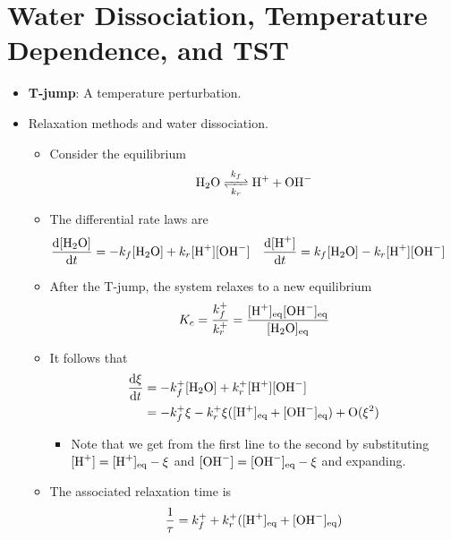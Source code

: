\documentclass[../notes.tex]{subfiles}
\begin{document}
\section{Water Dissociation, Temperature Dependence, and TST}
\begin{itemize}
    \item {}\textbf{T-jump}: A temperature perturbation.
    \item Relaxation methods and water dissociation.
    \begin{itemize}
        \item Consider the equilibrium
        \begin{equation*}
            \ce{H2O <=>[$k_f$][$k_r$] H+ + OH-}
        \end{equation*}
        \item The differential rate laws are
        \begin{align*}
            \dv{[\ce{H2O}]}{t} &= -k_f[\ce{H2O}]+k_r[\ce{H+}][\ce{OH-}]&
            \dv{[\ce{H+}]}{t} &= k_f[\ce{H2O}]-k_r[\ce{H+}][\ce{OH-}]
        \end{align*}
        \item After the T-jump, the system relaxes to a new equilibrium
        \begin{equation*}
            K_c = \frac{k_f^+}{k_r^+}
            = \frac{[\ce{H+}]_\text{eq}[\ce{OH-}]_\text{eq}}{[\ce{H2O}]_\text{eq}}
        \end{equation*}
        \item It follows that
        \begin{align*}
            \dv{\xi}{t} &= -k_f^+[\ce{H2O}]+k_r^+[\ce{H+}][\ce{OH-}]\\
            &= -k_f^+\xi-k_r^+\xi([\ce{H+}]_\text{eq}+[\ce{OH-}]_\text{eq})+\text{O}(\xi^2)
        \end{align*}
        \begin{itemize}
            \item Note that we get from the first line to the second by substituting $[\ce{H+}]=[\ce{H+}]_\text{eq}-\xi$ and $[\ce{OH-}]=[\ce{OH-}]_\text{eq}-\xi$ and expanding.
        \end{itemize}
        \item The associated relaxation time is
        \begin{equation*}
            \frac{1}{\tau} = k_f^++k_r^+([\ce{H+}]_\text{eq}+[\ce{OH-}]_\text{eq})
        \end{equation*}
        \begin{itemize}

\end{itemize}
\end{itemize}
\end{itemize}
\end{document}
